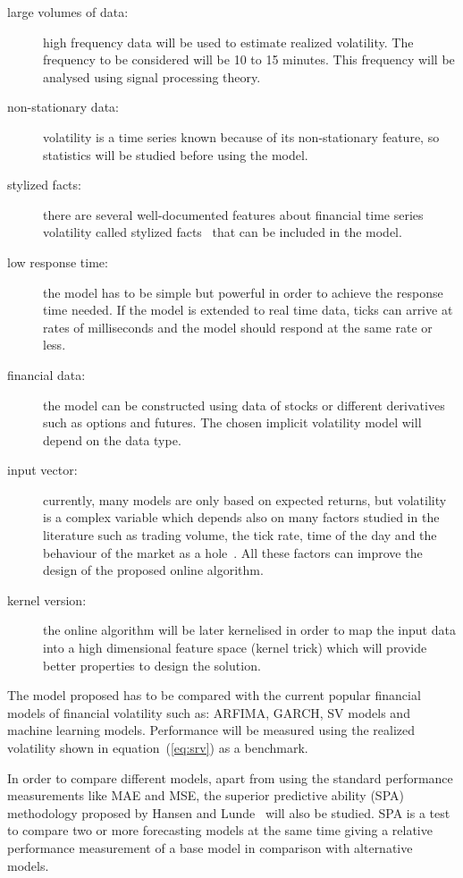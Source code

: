 \begin{description}%
    \item[large volumes of data:] high frequency data will be used to estimate realized volatility. The frequency to be considered will be 10 to 15 minutes. This frequency will be analysed using signal processing theory. 
    \item[non-stationary data:] volatility is a time series known because of its non-stationary feature, so statistics will be studied before using the model.
    \item[stylized facts:] there are several well-documented features about financial time series volatility called stylized facts~\cite{poon+granger2003} that can be included in the model.
    \item[low response time:] the model has to be simple but powerful in order to achieve the response time needed. If the model is extended to real time data, ticks can arrive at rates of milliseconds and the model should respond at the same rate or less.
    \item[financial data:] the model can be constructed using data of stocks or different derivatives such as options and futures. The chosen implicit volatility model will depend on the data type.
    \item[input vector:] currently, many models are only based on expected returns, but volatility is a complex variable which depends also on many factors studied in the literature such as trading volume, the tick rate, time of the day and the behaviour of the market as a hole~\cite{gatheral2006}. All these factors can improve the design of the proposed online algorithm.
    \item[kernel version:] the online algorithm will be later kernelised in order to map the input data into a high dimensional feature space (kernel trick) which will provide better properties to design the solution.
\end{description}

The model proposed has to be compared with the current popular financial models of financial volatility such as: ARFIMA, GARCH, SV models and machine learning models. Performance will be measured using the realized volatility shown in equation~(\ref{eq:srv}) as a benchmark.

In order to compare different models, apart from using the standard performance measurements like MAE and MSE, the superior predictive ability (SPA) methodology proposed by Hansen and Lunde~\cite{hansen+lunde2006} will also be studied. SPA is a test to compare two or more forecasting models at the same time giving a relative performance measurement of a base model in comparison with alternative models. 

